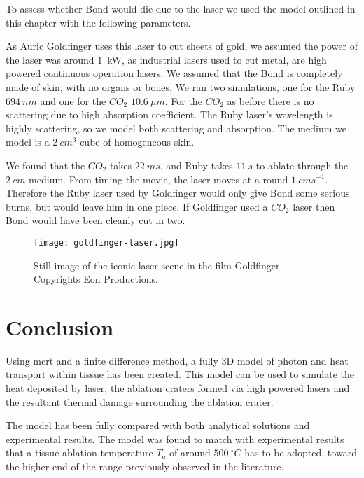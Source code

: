 To assess whether Bond would die due to the laser we used the model outlined in this chapter with the following parameters.

As Auric Goldfinger uses this laser to cut sheets of gold, we assumed the power of the laser was around $1$~kW, as industrial lasers used to cut metal, are high powered continuous operation lasers.
We assumed that the Bond is completely made of skin, with no organs or bones.
We ran two simulations, one for the Ruby $694~nm$ and one for the $CO_2$ $10.6~\mu m$.
For the $CO_2$ as before there is no scattering due to high absorption coefficient. The Ruby laser's wavelength is highly scattering, so we model both scattering and absorption.
The medium we model is a $2~cm^3$ cube of homogeneous skin.

We found that the $CO_2$ takes $22~ms$, and Ruby takes $11~s$ to ablate through the $2~cm$ medium.
From timing the movie, the laser moves at a round $1~cms^{-1}$.
Therefore the Ruby laser used by Goldfinger would only give Bond some serious burns, but would leave him in one piece.
If Goldfinger used a $CO_2$ laser then Bond would have been cleanly cut in two.


\begin{figure}[!htpb]
	\centering
	\texttt{[image: goldfinger-laser.jpg]}
	\caption{Still image of the iconic laser scene in the film Goldfinger. Copyrights Eon Productions.}
	\label{fig:goldfinger}
\end{figure}

\section{Conclusion}

Using \gls*{mcrt} and a finite difference method, a fully 3D model of photon and heat transport within tissue has been created. This model can be used to simulate the heat deposited by laser, the ablation craters formed via high powered lasers and the resultant thermal damage surrounding the ablation crater.

The model has been fully compared with both analytical solutions and experimental results. 
The model was found to match with experimental results that a tissue ablation temperature $T_a$ of around $500~^{\circ}C$ has to be adopted, toward the higher end of the range previously observed in the literature.

